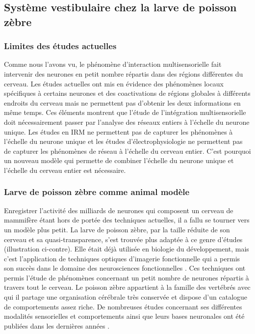 
\subsection{Système vestibulaire chez la larve de poisson zèbre}

\subsubsection{Limites des études actuelles}

Comme nous l'avons vu, le phénomène d'interaction multisensorielle fait intervenir des neurones en petit nombre répartis dans des régions différentes du cerveau. Les études actuelles ont mis en évidence des phénomènes locaux spécifiques à certains neurones et des coactivations de régions globales à différents endroits du cerveau mais ne permettent pas d'obtenir les deux informations en même temps. 
Ces éléments montrent que l'étude de l'intégration multisensorielle doit nécessairement passer par l'analyse des réseaux entiers à l'échelle du neurone unique. Les études en IRM ne permettent pas de capturer les phénomènes à l'échelle du neurone unique et les études d'électrophysiologie ne permettent pas de capturer les phénomènes de réseau à l'échelle du cerveau entier. C'est pourquoi un nouveau modèle qui permette de combiner l'échelle du neurone unique et l'échelle du cerveau entier est nécessaire.

\subsubsection{Larve de poisson zèbre comme animal modèle}

Enregistrer l'activité des milliards de neurones qui composent un cerveau de mammifère étant hors de portée des techniques actuelles, il a fallu se tourner vers un modèle plus petit. La larve de poisson zèbre, par la taille réduite de son cerveau et sa quasi-transparence, s'est trouvée plus adaptée à ce genre d'études (illustration ci-contre).
Elle était déjà utilisée en biologie du développement, mais c'est l'application de techniques optiques d'imagerie fonctionnelle qui a permis son succès dans le domaine des neurosciences fonctionnelles \cite{ahrens_brain-wide_2012}\cite{panier_fast_2013}\cite{ahrens_whole-brain_2013}. Ces techniques ont permis l'étude de phénomènes concernant un petit nombre de neurones répartis à travers tout le cerveau.
Le poisson zèbre appartient à la famille des vertébrés avec qui il partage une organisation cérébrale très conservée et dispose d'un catalogue de comportements assez riche. De nombreuses études concernant ses différentes modalités sensorielles et comportements ainsi que leurs bases neuronales ont été publiées dans les dernières années \cite{wolf_sensorimotor_2017}\cite{bollmann_zebrafish_2019}\cite{ehrlich_primal_2019}\cite{karpenko_behavior_2020}.

